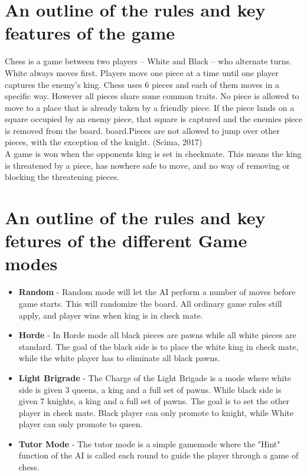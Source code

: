 \documentclass{article}
\begin{document}
    \section{An outline of the rules and key features of the game}
    \noindent
    Chess is a game between two players  -- White and Black -- who alternate turns. White always moves first. Players move one piece at a time until one player captures the enemy's king.  Chess uses 6 pieces and each of them moves in a specific way. However all pieces share some common traits. No piece is allowed to move to a place that is already taken by a friendly piece. If the piece lands on a square occupied by an enemy piece, that square is captured and the enemies piece is removed from the board. board.Pieces are not allowed to jump over other pieces, with the exception of the knight. (Scima, 2017)\\
A game is won when the opponents king is set in checkmate. This means the king is threatened by a piece, has nowhere
safe to move, and no way of removing or blocking the threatening pieces.\\

 \section{An outline of the rules and key fetures of the different Game modes}
		\begin{itemize}
\item \textbf{Random}
 - Random mode will let the AI perform a number of moves before game starts. This will randomize the board. All ordinary game rules still apply, and player wins when king is in check mate.
\item \textbf{Horde}
 - In Horde mode all black pieces are pawns while all white pieces are standard. The goal of the black side is to place the white king in check mate, while the white player has to eliminate all black pawns.
\item \textbf{Light Brigrade}
 - The Charge of the Light Brigade is a mode where white side is given 3 queens, a king and a full set of pawns. While black side is given 7 knights, a king and a full set of pawns. The goal is to set the other player in check mate. Black player can only promote to knight, while White player can only promote to queen.
\item \textbf{Tutor Mode}
 - The tutor mode is a simple gamemode where the "Hint" function of the AI is called each round to guide the player through a game of chess. 
\end{itemize}
\end{document}
